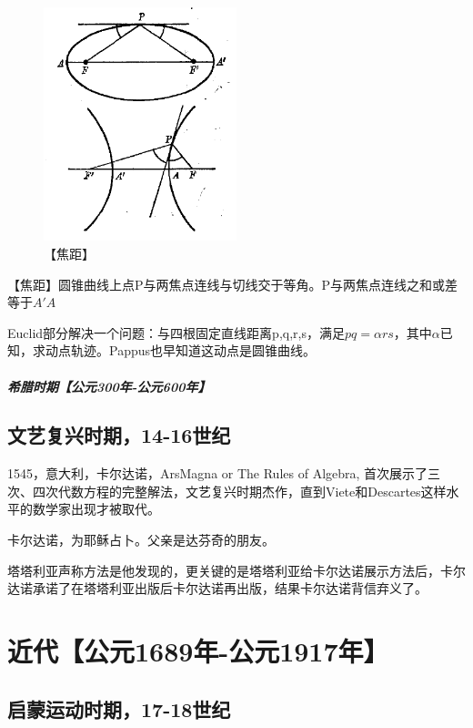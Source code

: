 \documentclass[UTF8]{../09-Mathematics}
\begin{document}
\begin{figure}[h]
    \centering
    \includegraphics[width=0.5\textwidth]{./resources/古今数学思想-图4_29.png}
    \caption{【焦距】}\label{fig:7}
\end{figure}
【焦距】圆锥曲线上点P与两焦点连线与切线交于等角。P与两焦点连线之和或差等于$A'A$

Euclid部分解决一个问题：与四根固定直线距离p,q,r,s，满足$pq = \alpha rs$，其中$\alpha$已知，求动点轨迹。Pappus也早知道这动点是圆锥曲线。

\paragraph{希腊时期【公元300年-公元600年】}




\section{文艺复兴时期，14-16世纪}

1545，意大利，卡尔达诺，ArsMagna or The Rules of Algebra, 首次展示了三次、四次代数方程的完整解法，文艺复兴时期杰作，直到Viete和Descartes这样水平的数学家出现才被取代。

卡尔达诺，为耶稣占卜。父亲是达芬奇的朋友。

塔塔利亚声称方法是他发现的，更关键的是塔塔利亚给卡尔达诺展示方法后，卡尔达诺承诺了在塔塔利亚出版后卡尔达诺再出版，结果卡尔达诺背信弃义了。


\chapter{近代【公元1689年-公元1917年】}

\section{启蒙运动时期，17-18世纪}
\end{document}
